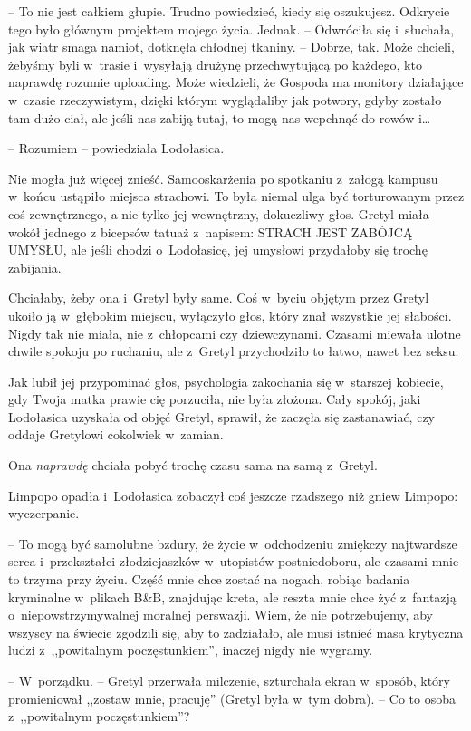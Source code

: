 \documentclass[oneside,polish,11pt,sfheadings]{mwbk}
\begin{document}
-- To nie jest całkiem głupie. Trudno powiedzieć, kiedy się oszukujesz.
Odkrycie tego było głównym projektem mojego życia. Jednak. -- Odwróciła
się i~słuchała, jak wiatr smaga namiot, dotknęła chłodnej tkaniny. -- Dobrze, tak. Może chcieli, żebyśmy byli w~trasie i~wysyłają drużynę
przechwytującą po każdego, kto naprawdę rozumie uploading. Może
wiedzieli, że Gospoda ma monitory działające w~czasie rzeczywistym,
dzięki którym wyglądaliby jak potwory, gdyby zostało tam dużo ciał, ale
jeśli nas zabiją tutaj, to mogą nas wepchnąć do rowów i\ldots 

-- Rozumiem -- powiedziała Lodołasica. 

Nie mogła już więcej znieść.
Samooskarżenia po spotkaniu z~załogą kampusu w~końcu ustąpiło miejsca
strachowi. To była niemal ulga być torturowanym przez coś zewnętrznego,
a nie tylko jej wewnętrzny, dokuczliwy głos. Gretyl miała wokół jednego
z bicepsów tatuaż z~napisem: STRACH JEST ZABÓJCĄ UMYSŁU, ale jeśli
chodzi o~Lodołasicę, jej umysłowi przydałoby się trochę zabijania.

Chciałaby, żeby ona i~Gretyl były same. Coś w~byciu objętym przez Gretyl
ukoiło ją w~głębokim miejscu, wyłączyło głos, który znał wszystkie jej
słabości. Nigdy tak nie miała, nie z~chłopcami czy dziewczynami. Czasami
miewała ulotne chwile spokoju po ruchaniu, ale z~Gretyl przychodziło to
łatwo, nawet bez seksu.

Jak lubił jej przypominać głos, psychologia zakochania się w~starszej
kobiecie, gdy Twoja matka prawie cię porzuciła, nie była złożona. Cały
spokój, jaki Lodołasica uzyskała od objęć Gretyl, sprawił, że zaczęła
się zastanawiać, czy oddaje Gretylowi cokolwiek w~zamian.

Ona \textit{naprawdę} chciała pobyć trochę czasu sama na samą z~Gretyl.

Limpopo opadła i~Lodołasica zobaczył coś jeszcze rzadszego niż gniew
Limpopo: wyczerpanie. 

-- To mogą być samolubne bzdury, że życie w~odchodzeniu zmiękczy najtwardsze serca i~przekształci złodziejaszków w~utopistów postniedoboru, ale czasami mnie to trzyma przy życiu. Część
mnie chce zostać na nogach, robiąc badania kryminalne w~plikach B\&B,
znajdując kreta, ale reszta mnie chce żyć z~fantazją o~niepowstrzymywalnej moralnej perswazji. Wiem, że nie potrzebujemy, aby
wszyscy na świecie zgodzili się, aby to zadziałało, ale musi istnieć
masa krytyczna ludzi z~,,powitalnym poczęstunkiem'', inaczej nigdy nie
wygramy.

-- W~porządku. -- Gretyl przerwała milczenie, szturchała ekran w~sposób,
który promieniował ,,zostaw mnie, pracuję'' (Gretyl była w~tym dobra). -- Co to osoba z~,,powitalnym poczęstunkiem''?
\end{document}
